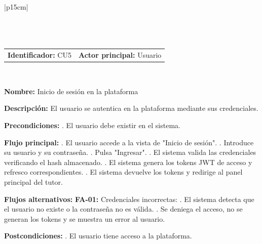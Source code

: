\begingroup
{}
\setlength{\arrayrulewidth}{1pt}
\begin{longtable}{|p{15cm}|}
  \hline
   \\
  \hline
  \endfirsthead
   \\
  \hline
   \\
  \hline
  \endhead
  \hline {} \\ \hline
  \endfoot
  \hline
  \caption{Caso de uso 5 — Inicio de sesión en la plataforma.}
  \label{TB:CU5_LOGIN}
  \endlastfoot

  \begin{tabularx}{\linewidth}{@{}X X@{}}
    \textbf{Identificador:} CU5 & \textbf{Actor principal:} Usuario
  \end{tabularx} \\ \hline

  \textbf{Nombre:} Inicio de sesión en la plataforma \\ \hline

  \textbf{Descripción:} \newline 
  El usuario se autentica en la plataforma mediante sus credenciales. \\ \hline

  \textbf{Precondiciones:} . El usuario debe existir en el sistema. \\ \hline

  \textbf{Flujo principal:} . El usuario accede a la vista de "Inicio de sesión". . Introduce su usuario y su contraseña. . Pulsa "Ingresar". . El sistema valida las credenciales verificando el hash almacenado. . El sistema genera los tokens JWT de acceso y refresco correspondientes. . El sistema devuelve los tokens y redirige al panel principal del tutor. \\ \hline

  \textbf{Flujos alternativos:} \newline
  \textbf{FA-01:} Credenciales incorrectas: . El sistema detecta que el usuario no existe o la contraseña no es válida. . Se deniega el acceso, no se generan los tokens y se muestra un error al usuario. \\ \hline

  \textbf{Postcondiciones:} . El usuario tiene acceso a la plataforma. \\ \hline

\end{longtable}
